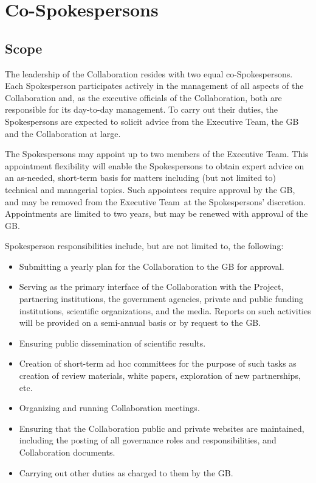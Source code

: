 \documentclass[12pt]{article}
\newcommand{\exec}{{Executive Team}}
\begin{document}
\section{Co-Spokespersons}
\label{sec:spokes}

\subsection{Scope}

The leadership of the Collaboration resides with two equal co-Spokespersons. Each Spokesperson participates actively in the management of all aspects of the Collaboration and, as the executive officials of the Collaboration, both  are responsible for its day-to-day management. To carry out their duties, the Spokespersons are expected to solicit advice from the \exec, the GB and the Collaboration at large.

The Spokespersons may appoint up to two members of the \exec. This appointment flexibility will enable the Spokespersons to obtain expert advice on an as-needed, short-term basis for matters including (but not limited to) technical and managerial topics.
Such appointees require approval by the GB, and may be removed from the \exec\ at the Spokespersons' discretion.  Appointments are limited to two years, but may be renewed with approval of the GB.

Spokesperson responsibilities include, but are not limited to, the following:
\begin{itemize}
\item Submitting a yearly plan for the Collaboration to the GB for approval.
\item Serving as the primary interface of the Collaboration with the Project, partnering institutions, the government agencies, private and public funding institutions, scientific organizations, and the media. Reports on such activities will be provided on a semi-annual basis or by request to the GB.
\item Ensuring public dissemination of scientific results.
\item Creation of short-term ad hoc committees for the purpose of such tasks as creation of review materials, white papers, exploration of new partnerships, etc.
\item Organizing and running Collaboration meetings.
\item Ensuring that the Collaboration public and private websites are maintained, including the posting of all governance roles and responsibilities, and Collaboration documents.
\item Carrying out other duties as charged to them by the GB.
\end{itemize}
\end{document}
